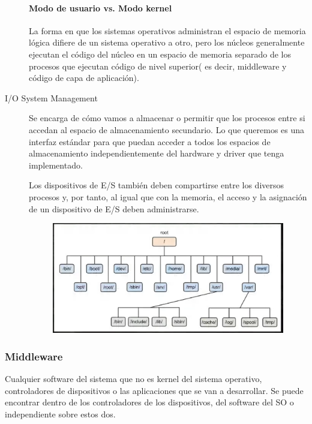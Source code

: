\documentclass[12pt]{report} %
\begin{document}
\begin{description}
	\paragraph{Modo de usuario vs. Modo kernel}
		La forma en que los sistemas operativos administran el espacio de memoria lógica difiere de un sistema operativo a otro, pero los núcleos generalmente ejecutan el código del núcleo en un espacio de memoria separado de los procesos que ejecutan código de nivel superior( es decir, middleware y código de capa de aplicación).

	
	\item[I/O System Management] Se encarga de cómo vamos a almacenar o permitir que los procesos entre si accedan al espacio de almacenamiento secundario. Lo que queremos es una interfaz estándar para que puedan acceder a todos los espacios de almacenamiento independientemente del hardware y driver que tenga implementado.

	Los dispositivos de E/S también deben compartirse entre los diversos procesos y, por tanto, al igual que con la memoria, el acceso y la asignación de un dispositivo de E/S deben administrarse. 

	\begin{figure}[H]
		{\includegraphics[scale=.5]{2021-03-25 11_52_40-2021-03-24 16-59-20.mkv.png}}
	\end{figure}

\end{description}

\subsubsection{Middleware}

Cualquier software del sistema que no es kernel del sistema operativo, controladores de dispositivos o las aplicaciones que se van a desarrollar. Se puede encontrar dentro de los controladores de los dispositivos, del software del SO o independiente sobre estos dos.
\end{document}

